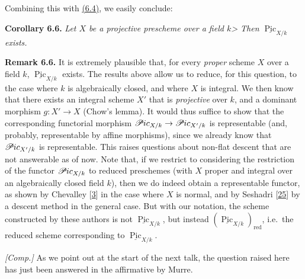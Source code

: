 \documentclass{article}
\newenvironment{itenv}[1]
  {\phantomsection\par\smallskip\noindent\textbf{#1.}\itshape}
  {\par\smallskip}
\newenvironment{rmenv}[1]
  {\phantomsection\par\smallskip\noindent\textbf{#1.}\rmfamily}
  {\par\smallskip}
\newcommand{\oldpage}[1]{\marginpar{\footnotesize$\Big\vert$ \textit{p.~#1}}}
\theoremstyle{definition}
\theoremstyle{definition}
\theoremstyle{definition}
\theoremstyle{definition}
\theoremstyle{remark}
\begin{document}
Combining this with \protect\hyperlink{fga-3-v-corollary-3.4}{(6.4)}, we easily conclude:

\leavevmode{}%
\begin{itenv}{Corollary 6.6}
Let \(X\) be a projective prescheme over a field \(k\)\textgreater{}
Then \(\underline{\operatorname{Pic}}_{X/k}\) exists.

\end{itenv}

\leavevmode{}%
\begin{rmenv}{Remark 6.6}
It is extremely plausible that, for every \emph{proper} scheme \(X\) over a field \(k\), \(\underline{\operatorname{Pic}}_{X/k}\) exists.
The results above allow us to reduce, for this question, to the case where \(k\) is algebraically closed, and where \(X\) is integral.
We then know that there exists an integral scheme \(X'\) that is \emph{projective} over \(k\), and a dominant morphism \(g\colon X'\to X\) (Chow's lemma).
\oldpage{232-18}It would thus suffice to show that the corresponding functorial morphism \(\mathscr{P}\kern -.5pt ic_{X/k}\to\mathscr{P}\kern -.5pt ic_{X'/k}\) is representable (and, probably, representable by affine morphisms), since we already know that \(\mathscr{P}\kern -.5pt ic_{X'/k}\) is representable.
This raises questions about non-flat descent that are not answerable as of now.
Note that, if we restrict to considering the restriction of the functor \(\mathscr{P}\kern -.5pt ic_{X/k}\) to reduced preschemes (with \(X\) proper and integral over an algebraically closed field \(k\)), then we do indeed obtain a representable functor, as shown by Chevalley {[}\protect\hyperlink{ref-Che1960}{3}{]} in the case where \(X\) is normal, and by Seshadri {[}\protect\hyperlink{ref-Ses1962}{25}{]} by a descent method in the general case.
But with our notation, the scheme constructed by these authors is not \(\underline{\operatorname{Pic}}_{X/k}\), but instead \((\underline{\operatorname{Pic}}_{X/k})_\mathrm{red}\), i.e.~the reduced scheme corresponding to \(\underline{\operatorname{Pic}}_{X/k}\).

\emph{{[}Comp.{]}}
As we point out at the start of the next talk, the question raised here has just been answered in the affirmative by Murre.

\end{rmenv}
\end{document}
